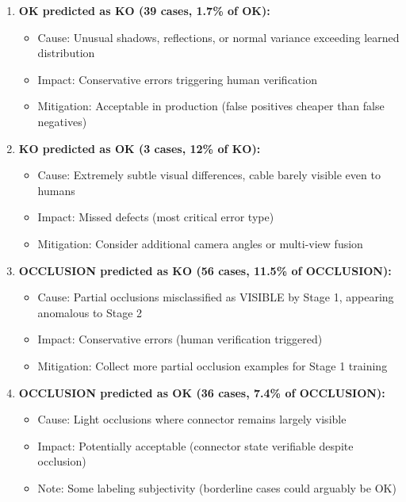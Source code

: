 \documentclass[11pt,a4paper,draft]{article}
\begin{document}
\begin{enumerate}
    \item \textbf{OK predicted as KO (39 cases, 1.7\% of OK):}
    \begin{itemize}
        \item Cause: Unusual shadows, reflections, or normal variance exceeding learned distribution
        \item Impact: Conservative errors triggering human verification
        \item Mitigation: Acceptable in production (false positives cheaper than false negatives)
    \end{itemize}
    
    \item \textbf{KO predicted as OK (3 cases, 12\% of KO):}
    \begin{itemize}
        \item Cause: Extremely subtle visual differences, cable barely visible even to humans
        \item Impact: Missed defects (most critical error type)
        \item Mitigation: Consider additional camera angles or multi-view fusion
    \end{itemize}
    
    \item \textbf{OCCLUSION predicted as KO (56 cases, 11.5\% of OCCLUSION):}
    \begin{itemize}
        \item Cause: Partial occlusions misclassified as VISIBLE by Stage 1, appearing anomalous to Stage 2
        \item Impact: Conservative errors (human verification triggered)
        \item Mitigation: Collect more partial occlusion examples for Stage 1 training
    \end{itemize}
    
    \item \textbf{OCCLUSION predicted as OK (36 cases, 7.4\% of OCCLUSION):}
    \begin{itemize}
        \item Cause: Light occlusions where connector remains largely visible
        \item Impact: Potentially acceptable (connector state verifiable despite occlusion)
        \item Note: Some labeling subjectivity (borderline cases could arguably be OK)
    \end{itemize}
\end{enumerate}
\end{document}
